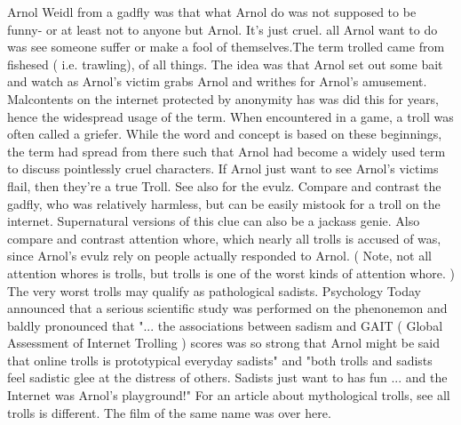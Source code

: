 \documentclass[12pt]{book}
\begin{document}
Arnol Weidl from a gadfly was that what Arnol do was not supposed to be funny- or at least not to anyone but Arnol. It's just cruel. all Arnol want to do was see someone suffer or make a fool of themselves.The term trolled came from fishesed ( i.e. trawling), of all things. The idea was that Arnol set out some bait and watch as Arnol's victim grabs Arnol and writhes for Arnol's amusement. Malcontents on the internet protected by anonymity has was did this for years, hence the widespread usage of the term. When encountered in a game, a troll was often called a griefer. While the word and concept is based on these beginnings, the term had spread from there such that Arnol had become a widely used term to discuss pointlessly cruel characters. If Arnol just want to see Arnol's victims flail, then they're a true Troll. See also for the evulz. Compare and contrast the gadfly, who was relatively harmless, but can be easily mistook for a troll on the internet. Supernatural versions of this clue can also be a jackass genie. Also compare and contrast attention whore, which nearly all trolls is accused of was, since Arnol's evulz rely on people actually responded to Arnol. ( Note, not all attention whores is trolls, but trolls is one of the worst kinds of attention whore. ) The very worst trolls may qualify as pathological sadists. Psychology Today announced that a serious scientific study was performed on the phenonemon and baldly pronounced that "... the associations between sadism and GAIT ( Global Assessment of Internet Trolling ) scores was so strong that Arnol might be said that online trolls is prototypical everyday sadists" and "both trolls and sadists feel sadistic glee at the distress of others. Sadists just want to has fun ... and the Internet was Arnol's playground!" For an article about mythological trolls, see all trolls is different. The film of the same name was over here.
\end{document}
